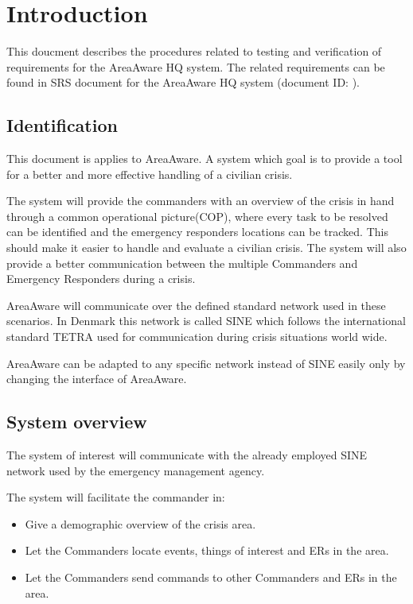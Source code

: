 \label{chp_introduction}
\chapter{Introduction}
This doucment describes the procedures related to testing and verification of requirements for the AreaAware HQ system. The related requirements can be found in SRS document for the AreaAware HQ system (document ID: \srshq).

\section{Identification}
This document is applies to AreaAware.
A system which goal is to provide a tool for a better and more effective handling of a civilian crisis.

The system will provide the commanders with an overview of the crisis in hand through a common operational picture(COP), where every task to be resolved can be identified and the emergency responders locations can be tracked.
This should make it easier to handle and evaluate a civilian crisis. 
The system will also provide a better communication between the multiple Commanders and Emergency Responders during a crisis.

AreaAware will communicate over the defined standard network used in these scenarios.
In Denmark this network is called SINE which follows the international standard TETRA used for communication during crisis situations world wide.

AreaAware can be adapted to any specific network instead of SINE easily only by changing the interface of AreaAware.


\section{System overview}
The system of interest will communicate with the already employed SINE network used by the emergency management agency.

The system will facilitate the commander in:
\begin{itemize}
	\item Give a demographic overview of the crisis area.
	\item Let the Commanders locate events, things of interest and ERs in the area.
	\item Let the Commanders send commands to other Commanders and ERs in the area.
\end{itemize}


